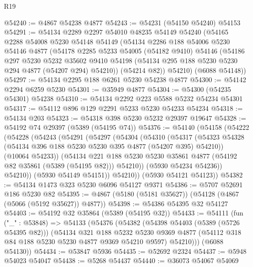 \begin{lexlean}{R19}
\begin{coremodule}
@54240 := @4867 @54238 @4877
@54243 := @54231 (@54150 @54240) @54153
@54291 := @54134
    @2289
    @2297
    @54010
    @48235
    @54149
    @54240
    (@54165
      @2288
      @54008
      @5230
      @54148
      @54149
      (@54134
        @2286
        @188
        @54006
        @5230
        @54146
        @4877
        (@54178
          @2285
          @5233
          @54005
          (@54182 @9410)
          @54146
          (@54186
            @297
            @5230
            @5232
            @35602
            @9410
            @54198
            (@54134 @295 @188 @5230 @5230 @294 @4877 (@54207 @294) @54210))
          (@54214 @82))
        @54210)
      (@6088 @54148))
@54297 := @54134 @2295 @188 @6261 @5230 @54238 @4877
@54300 := @54142 @2294 @6259 @5230
@54301 := @35949 @4877
@54304 := @54300 (@54235 @54301) @54238
@54310 := @54134 @2292 @223 @5588 @5232 @54234 @54301
@54317 := @54112 @896 @129 @2291 @5233 @5230 @54233 @54234
@54318 := @54134 @203
@54323 := @54318 @398 @5230 @5232 @29397 @19647
@54328 := @54192 @74 @29397 (@5389 (@54195 @74))
@54376 := @54140
    (@54158
      (@54222
        (@54228
          (@54243
            (@54291
              (@54297
                (@54304
                  (@54310
                    (@54317
                      (@54323 @54328 (@54134 @396 @188 @5230 @5230 @395 @4877 (@54207 @395) @54210))
                      (@10064 @54233))
                    (@54134
                      @221
                      @188
                      @5230
                      @5230
                      @35861
                      @4877
                      (@54192 @82 @35861 (@5389 (@54195 @82)))
                      @54210))
                  (@5930 @54234 @54236))
                @54210))
            (@5930 @54149 @54151))
          @54210))
      (@5930 @54121 @54123))
@54382 := @54134 @1473 @323 @5230 @6096 @54127 @9371
@54386 := @5707 @52691 @186 @5230 @82
@54395 := @4867 (@5180 (@5181 @35627)) (@54128 (@4867 (@5066 (@5192 @35627)) @4877))
@54398 := @54386 @54395 @32 @54127
@54403 := @54192 @32 @35864 (@5389 (@54195 @32))
@54433 := @54111
    (fun ("_" : @53848) =>
    @54133
      (@54376
        (@54382
          (@54398 @54403 (@5389 (@5726 @54395 @82)))
          (@54134
            @321
            @188
            @5232
            @5230
            @9369
            @4877
            (@54112 @318 @84 @188 @5230 @5230 @4877 @9369 @54210 @9597)
            @54210)))
      (@6088 @54130))
@54434 := @53847 @5936
@54435 := @52692 @2324
@54437 := @5948 @54023 @54047
@54438 := @5268 @54437
@54440 := @36073 @54067 @54069

\end{coremodule}
\end{lexlean}
